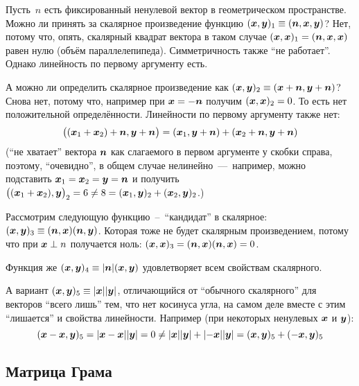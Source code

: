 \documentclass[a4paper,12pt]{article}
\begin{document}
  \begin{example}[\# 25.1]
    Пусть~$n$ есть фиксированный ненулевой вектор в геометрическом пространстве.
    Можно ли принять за скалярное произведение функцию $(\bds x, \bds y)_1 \hm\equiv (\bds n, \bds x, \bds y)$?
    Нет, потому что, опять, скалярный квадрат вектора в таком случае $(\bds x, \bds x)_1 \hm= (\bds n, \bds x, \bds x)$ равен нулю (объём параллелепипеда).
    Симметричность также ``не работает''.
    Однако линейность по первому аргументу есть.
    
    А можно ли определить скалярное произведение как $(\bds x, \bds y)_2 \hm\equiv (\bds x \hm+ \bds n, \bds y \hm+ \bds n)$?
    Снова нет, потому что, например при $\bds x \hm= -{\bds n}$ получим $(\bds x, \bds x)_2 \hm= 0$.
    То есть нет положительной определённости.
    Линейности по первому аргументу также нет:
    \[
      \bigl((\boldsymbol x_1 + \boldsymbol x_2) + \boldsymbol n, \boldsymbol y + \boldsymbol n\bigr)
      = (\boldsymbol x_1, \boldsymbol y + \boldsymbol n) + (\boldsymbol x_2 + \boldsymbol n, \boldsymbol y + \boldsymbol n)
    \]
    (``не хватает'' вектора $\boldsymbol n$ как слагаемого в первом аргументе у скобки справа, поэтому, ``очевидно'', в общем случае нелинейно~---~например, можно подставить $\bds x_1 \hm= \bds x_2 \hm= \bds y \hm= \bds n$ и получить $\bigl((\bds x_1 \hm+ \bds x_2), \bds y\bigr)_2 \hm= 6 \hm{\not=} 8 \hm= (\bds x_1, \bds y)_2 \hm+ (\bds x_2, \bds y)_2$.)
    
    Рассмотрим следующую функцию~--~``кандидат'' в скалярное: $(\bds x, \bds y)_3 \hm\equiv (\bds n, \bds x)(\bds n, \bds y)$.
    Которая тоже не будет скалярным произведением, потому что при $\bds x \hm\perp n$ получается ноль: $(\bds x, \bds x)_3 \hm= (\bds n, \bds x) (\bds n, \bds x) \hm= 0$.
    
    Функция же $(\bds x, \bds y)_4 \hm\equiv |\bds n| (\bds x, \bds y)$ удовлетворяет всем свойствам скалярного.
    
    А вариант $(\bds x, \bds y)_5 \hm\equiv |\bds x| |\bds y|$, отличающийся от ``обычного скалярного'' для векторов ``всего лишь'' тем, что нет косинуса угла, на самом деле вместе с этим ``лишается'' и свойства линейности.
    Например (при некоторых ненулевых $\boldsymbol x$ и $\boldsymbol y$):
    \[
      (\boldsymbol x - \boldsymbol x, \boldsymbol y)_5 = |\boldsymbol x - \boldsymbol x| |\boldsymbol y| = 0
      \not= |\boldsymbol x| |\boldsymbol y| + |{-}{\boldsymbol x}| |\boldsymbol y| = (\boldsymbol x, \boldsymbol y)_5 + ({-}{\boldsymbol x}, \boldsymbol y)_5
    \]
  \end{example}
  
  
  \subsection{Матрица Грама}
  
\end{document}
